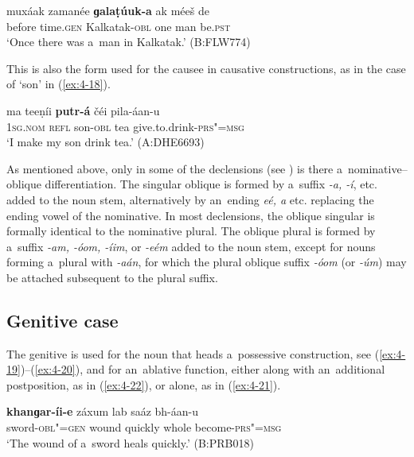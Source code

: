 \begin{exe}
\ex
\label{ex:4-17}
\gll muxáak zamanée \textbf{ɡalaṭúuk-a} ak méeš de \\
	before time.\textsc{gen} Kalkatak-\textsc{obl} one man be.\textsc{pst} \\
\glt `Once there was a~man in Kalkatak.' (B:FLW774)
\end{exe}

This is also the form used for the causee in causative constructions, as in the case of `son' in (\ref{ex:4-18}). 


\begin{exe}
\ex
\label{ex:4-18}
\gll ma teeṇíi \textbf{putr-á} čéi pila-áan-u \\
	\textsc{1sg.nom} \textsc{refl} son-\textsc{obl} tea give.to.drink-\textsc{prs"=msg} \\
\glt `I make my son drink tea.' (A:DHE6693)
\end{exe}

As mentioned above, only in some of the declensions (see ) is there a~nominative--oblique differentiation. The singular oblique is formed by a~suffix \textit{-a, -í}, etc. added to the noun stem, alternatively by an~ending \textit{eé, a} etc. replacing the ending vowel of the nominative. In most declensions, the oblique singular is formally identical to the nominative plural. The oblique plural is formed by a~suffix \textit{-am, -óom, -íim}, or \textit{-eém} added to the noun stem, except for nouns forming a~plural with \textit{-aán}, for which the plural oblique suffix \textit{-óom} (or \textit{-úm}) may be attached subsequent to the plural suffix.

\subsection{Genitive case}
\label{subsec:4-5-3}

The genitive is used for the noun that heads a~possessive construction, see (\ref{ex:4-19})--(\ref{ex:4-20}), and for an~ablative function, either along with an~additional postposition, as in (\ref{ex:4-22}), or alone, as in (\ref{ex:4-21}).


\begin{exe}
\ex
\label{ex:4-19}
\gll \textbf{khanɡar-íi-e} záxum lab saáz bh-áan-u \\
	sword-\textsc{obl"=gen} wound quickly whole become-\textsc{prs"=msg} \\
\glt `The wound of a~sword heals quickly.' (B:PRB018)
\end{exe}

